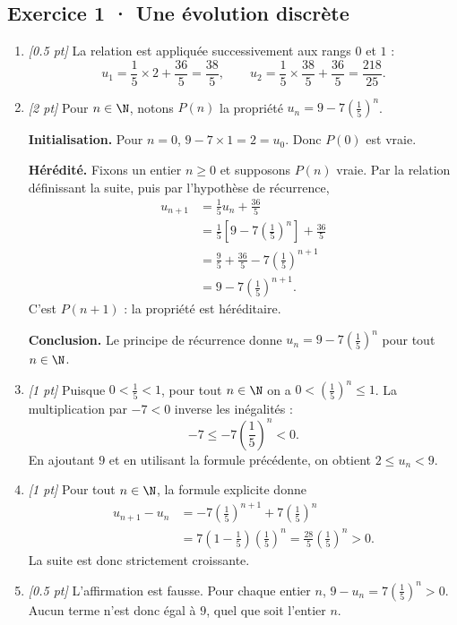 \subsection*{Exercice 1 · Une évolution discrète}\begin{enumerate}

\item \textit{[\num{0,5} pt]} La relation est appliquée successivement aux rangs $0$ et $1$ :\[u_1=\frac{1}{5}\times 2+\frac{36}{5}=\frac{38}{5},\qquad u_2=\frac{1}{5}\times \frac{38}{5}+\frac{36}{5}=\frac{218}{25}.\]

\item \textit{[2 pt]} Pour $n\in\N$, notons $P(n)$ la propriété $u_n=9-7\left(\frac{1}{5}\right)^n$.
\par\smallskip\textbf{Initialisation.} Pour $n=0$, $9-7\times1=2=u_0$. Donc $P(0)$ est vraie.
\par\smallskip\textbf{Hérédité.} Fixons un entier $n\ge0$ et supposons $P(n)$ vraie. Par la relation définissant la suite, puis par l'hypothèse de récurrence,
\[\begin{aligned}u_{n+1}&=\frac{1}{5}u_n+\frac{36}{5}\\
&=\frac{1}{5}\left[9-7\left(\frac{1}{5}\right)^n\right]+\frac{36}{5}\\
&=\frac{9}{5}+\frac{36}{5}-7\left(\frac{1}{5}\right)^{n+1}\\
&=9-7\left(\frac{1}{5}\right)^{n+1}.
\end{aligned}\]
C'est $P(n+1)$ : la propriété est héréditaire.
\par\smallskip\textbf{Conclusion.} Le principe de récurrence donne $u_n=9-7\left(\frac{1}{5}\right)^n$ pour tout $n\in\N$.

\item \textit{[1 pt]} Puisque $0<\frac{1}{5}<1$, pour tout $n\in\N$ on a $0<(\frac{1}{5})^n\le1$. La multiplication par $-7<0$ inverse les inégalités :
\[-7\le-7(\frac{1}{5})^n<0.\]
En ajoutant $9$ et en utilisant la formule précédente, on obtient $2\le u_n<9$.

\item \textit{[1 pt]} Pour tout $n\in\N$, la formule explicite donne
\[\begin{aligned}u_{n+1}-u_n&=-7(\frac{1}{5})^{n+1}+7(\frac{1}{5})^n\\&=7(1-\frac{1}{5})(\frac{1}{5})^n=\frac{28}{5}(\frac{1}{5})^n>0.\end{aligned}\]
La suite est donc strictement croissante.

\item \textit{[\num{0,5} pt]} L'affirmation est fausse. Pour chaque entier $n$, $9-u_n=7(\frac{1}{5})^n>0$. Aucun terme n'est donc égal à $9$, quel que soit l'entier $n$.

\end{enumerate}

